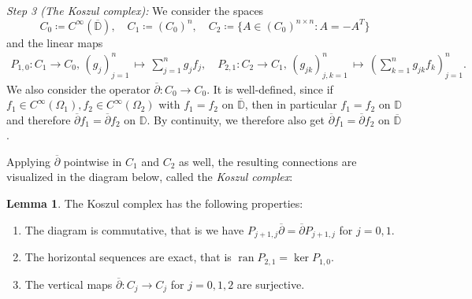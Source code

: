 \documentclass[letterpaper, 11pt]{article}
\newcommand{\D}{\mathbb{D}}
\newcommand{\1}{\mathds{1}}
\newcommand{\cl}[1]{\overline{#1}}
\newcommand{\wirtzbar}{\overline{\partial}}
\DeclareMathOperator*{\ran}{ran}
\theoremstyle{definition}
\newtheorem{lemma}[theorem]{Lemma}
\newenvironment{innerproof}
 {\renewcommand{\qedsymbol}{}\proof}
 {\endproof}
\begin{document}
\begin{innerproof}[Proof (continued)]
  \textit{Step 3 (The Koszul complex):}
  We consider the spaces
  \begin{equation*}
    C_0 \coloneqq C^\infty(\overline{\D}), \quad C_1 \coloneqq (C_0)^n, \quad C_2 \coloneqq \{ A \in (C_0)^{n \times n} : A = -A^T \}
  \end{equation*}
  and the linear maps
  \begin{align*}
    P_{1,0} : C_1 \to C_0,\, (g_j)_{j=1}^n \,\mapsto\, \sum_{j=1}^n g_j f_j, \quad P_{2,1} : C_2 \to C_1,\, (g_{jk})_{j,k=1}^n \,\mapsto\, \left( \sum_{k=1}^n g_{jk} f_k \right)_{j=1}^n.
  \end{align*}
  We also consider the operator $\wirtzbar : C_0 \to C_0$. It is well-defined, since if $f_1 \in C^\infty(\Omega_1), f_2 \in C^\infty(\Omega_2)$ with $f_1 = f_2$ on $\cl{\D}$, then in particular $f_1 = f_2$ on $\D$ and therefore $\wirtzbar f_1 = \wirtzbar f_2$ on $\D$. By continuity, we therefore also get $\wirtzbar f_1 = \wirtzbar f_2$ on $\cl{\D}$.

  Applying $\wirtzbar$ pointwise in $C_1$ and $C_2$ as well, the resulting connections are visualized in the diagram below, called the \emph{Koszul complex}:
  \begin{center}
  \end{center}
\end{innerproof}

\begin{lemma} \label{lem:koszul}
  The Koszul complex has the following properties:
  \begin{enumerate}
    \item The diagram is commutative, that is we have $P_{j+1,j} \wirtzbar = \wirtzbar P_{j+1,j}$ for $j = 0,1$.
    \item The horizontal sequences are exact, that is $\ran P_{2,1} = \ker P_{1,0}$.
    \item The vertical maps $\wirtzbar : C_j \to C_j$ for $j=0,1,2$ are surjective.
  \end{enumerate}
\end{lemma}
\end{document}
